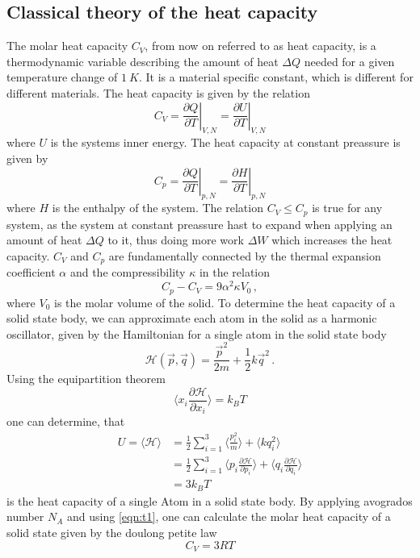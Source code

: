 \subsection{Classical theory of the heat capacity}
The molar heat capacity $C_V$, from now on referred to as heat capacity, is a thermodynamic variable describing the amount of heat $\Delta Q$ needed for a given temperature change of $\SI{1}{K}$. It is a material specific constant, which is different for different materials.
The heat capacity is given by the relation
\begin{equation}
    \label{eqn:t1}
    C_V = \left. \frac{\partial Q}{\partial T} \right|_{V, N} = \left. \frac{\partial U}{\partial T} \right|_{V, N}
\end{equation}
where $U$ is the systems inner energy. The heat capacity at constant preassure is given by
\begin{equation}
    C_p = \left. \frac{\partial Q}{\partial T} \right|_{p, N} = \left. \frac{\partial H}{\partial T} \right|_{p, N}
\end{equation}
where $H$ is the enthalpy of the system. The relation $C_V \leq C_p$ is true for any system, as the system at constant preassure hast to expand when applying an amount of heat $\Delta Q$ to it, thus doing more work $\Delta W$ which increases the heat capacity.
$C_V$ and $C_p$ are fundamentally connected by the thermal expansion coefficient $\alpha$ and the compressibility $\kappa$ in the relation
\begin{equation}
    \label{eqn:t2}
    C_p - C_V = 9 \alpha^2 \kappa V_0 \, ,
\end{equation}
where $V_0$ is the molar volume of the solid.
To determine the heat capacity of a solid state body, we can approximate each atom in the solid as a harmonic oscillator, given by the Hamiltonian for a single atom in the solid state body
\begin{equation}
    \mathcal{H} \left( \vec{p}, \vec{q} \right) = \frac{\vec{p}^2}{2m} + \frac{1}{2} k \vec{q}^2 \, .
\end{equation}
Using the equipartition theorem 
\begin{equation}
    \langle x_i \frac{\partial \mathcal{H}}{\partial x_i}\rangle = k_B T
\end{equation}
one can determine, that 
\begin{align}
    U = \langle \mathcal{H} \rangle &= \frac{1}{2} \sum_{i=1}^3 \langle \frac{p_i^2}{m} \rangle + \langle k q_i^2 \rangle \\
                                    &= \frac{1}{2} \sum_{i=1}^3 \langle p_i \frac{\partial \mathcal{H}}{\partial p_i} \rangle + \langle q_i \frac{\partial \mathcal{H}}{\partial q_i}\rangle \\
                                    &= 3 k_B T
\end{align}
is the heat capacity of a single Atom in a solid state body.
By applying avogrados number $N_A$ and using \autoref{eqn:t1}, one can calculate the molar heat capacity of a solid state given by the doulong petite law
\begin{equation}
    C_V = 3 R T
\end{equation}
